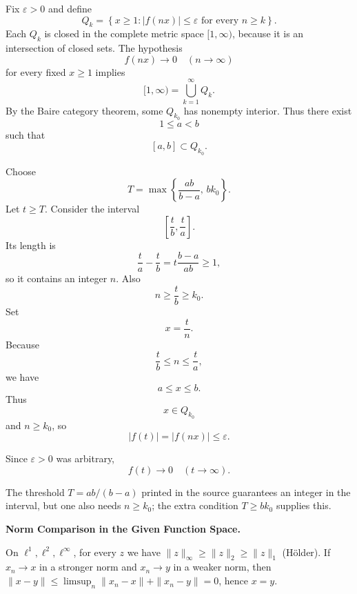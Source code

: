 \begin{solution}
Fix \(\varepsilon>0\) and define
\[
Q_k
=
\left\{
x\ge1:
|f(nx)|\le\varepsilon
\text{ for every }n\ge k
\right\}.
\]
Each \(Q_k\) is closed in the complete metric space \([1,\infty)\), because it is an
intersection of closed sets. The hypothesis
\[
f(nx)\to0
\quad(n\to\infty)
\]
for every fixed \(x\ge1\) implies
\[
[1,\infty)=\bigcup_{k=1}^{\infty}Q_k.
\]
By the Baire category theorem, some \(Q_{k_0}\) has nonempty interior. Thus there exist
\[
1\le a<b
\]
such that
\[
[a,b]\subset Q_{k_0}.
\]

Choose
\[
T
=
\max\left\{
\frac{ab}{b-a},
\,
bk_0
\right\}.
\]
Let \(t\ge T\). Consider the interval
\[
\left[\frac tb,\frac ta\right].
\]
Its length is
\[
\frac ta-\frac tb
=
t\frac{b-a}{ab}
\ge1,
\]
so it contains an integer \(n\). Also
\[
n\ge\frac tb\ge k_0.
\]
Set
\[
x=\frac tn.
\]
Because
\[
\frac tb\le n\le\frac ta,
\]
we have
\[
a\le x\le b.
\]
Thus
\[
x\in Q_{k_0}
\]
and \(n\ge k_0\), so
\[
|f(t)|
=
|f(nx)|
\le
\varepsilon.
\]

Since \(\varepsilon>0\) was arbitrary,
\[
\boxed{
f(t)\to0
\quad(t\to\infty).
}
\]

The threshold \(T=ab/(b-a)\) printed in the source guarantees an integer in the interval, but
one also needs \(n\ge k_0\); the extra condition \(T\ge bk_0\) supplies this.
\end{solution}


\begin{problem}[CP-II-0519]
\label{prob:cp-ii-0519}
\textbf{Norm Comparison in the Given Function Space.}

\hspace*{1.5em}On $\ell^1,\ell^2,\ell^\infty$, for every $z$ we have
	$\|z\|_\infty\ge \|z\|_2\ge \|z\|_1$ (Hölder).
	If $x_n\to x$ in a stronger norm and $x_n\to y$ in a weaker norm,
	then $\|x-y\|\le \limsup_n \|x_n-x\|+\|x_n-y\|=0$, hence $x=y$.
\end{problem}

